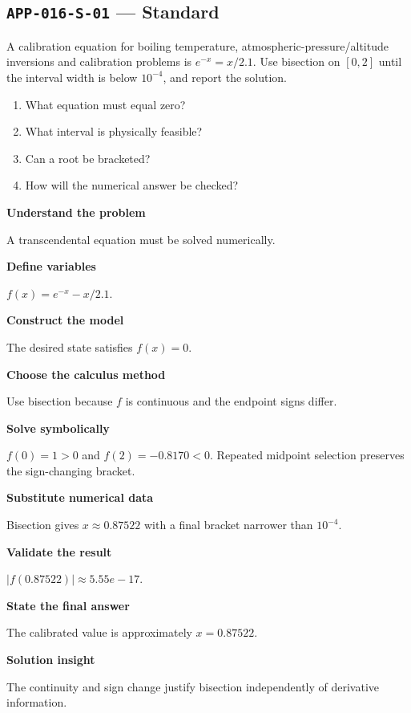 \documentclass[11pt]{book}
\newcommand{\pid}[1]{\texttt{#1}}
\begin{document}
\subsection*{\pid{APP-016-S-01} — Standard}
\begin{problembox}
A calibration equation for boiling temperature, atmospheric-pressure/altitude inversions and calibration problems is $e^{-x}=x/2.1$. Use bisection on $[0,2]$ until the interval width is below $10^{-4}$, and report the solution.
\end{problembox}
\begin{promptbox}\begin{enumerate}
\item What equation must equal zero?
\item What interval is physically feasible?
\item Can a root be bracketed?
\item How will the numerical answer be checked?
\end{enumerate}\end{promptbox}
\begin{solutionbox}
\textbf{Understand the problem}\par A transcendental equation must be solved numerically.\par\medskip
\textbf{Define variables}\par $f(x)=e^{-x}-x/2.1$.\par\medskip
\textbf{Construct the model}\par The desired state satisfies $f(x)=0$.\par\medskip
\textbf{Choose the calculus method}\par Use bisection because $f$ is continuous and the endpoint signs differ.\par\medskip
\textbf{Solve symbolically}\par $f(0)=1>0$ and $f(2)=-0.8170<0$. Repeated midpoint selection preserves the sign-changing bracket.\par\medskip
\textbf{Substitute numerical data}\par Bisection gives $x\approx 0.87522$ with a final bracket narrower than $10^{-4}$.\par\medskip
\textbf{Validate the result}\par $|f(0.87522)|\approx 5.55e-17$.\par\medskip
\textbf{State the final answer}\par The calibrated value is approximately $x=0.87522$.\par\medskip
\textbf{Solution insight}\par The continuity and sign change justify bisection independently of derivative information.\par\medskip
\end{solutionbox}
\end{document}
